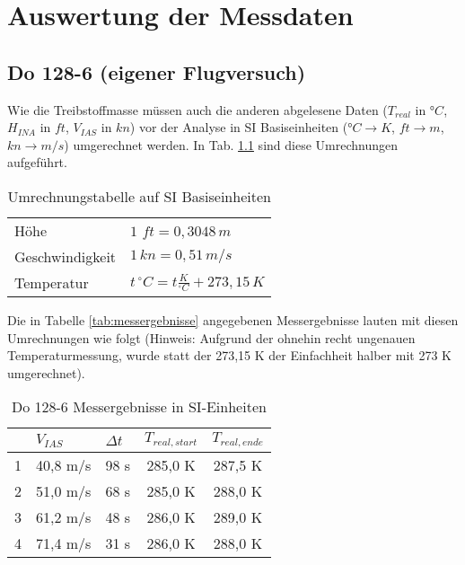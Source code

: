 \chapter{Auswertung der Messdaten}
\label{chapter:auswertung}

\section{Do 128-6 (eigener Flugversuch)}
Wie die Treibstoffmasse müssen auch die anderen abgelesene Daten ($T_{real}$ in °$C$, $H_{INA}$ in $ft$, $V_{IAS}$ in $kn$) vor der Analyse in SI Basiseinheiten (°$C  \rightarrow K$, $ft \rightarrow m$, $kn \rightarrow m/s$) umgerechnet werden. In Tab. \ref{tab:umrechnung_einheiten} sind diese Umrechnungen aufgeführt.\\

\begin{table}[h]
	\centering
	\begin{tabular}{l l}
		\hline
		Höhe 			& $1$ $ft = 0,3048\,m$ 								\\
		Geschwindigkeit	&   $1\,kn = 0,51\,m/s$								\\
		Temperatur 		&  $t\,^\circ C = t\frac{K}{^\circ C}+273,15\,K$	\\
		\hline		
	\end{tabular}
	\caption{Umrechnungstabelle auf SI Basiseinheiten} \label{tab:umrechnung_einheiten}
\end{table}

\noindent Die in Tabelle \ref{tab:messergebnisse} angegebenen Messergebnisse lauten mit diesen Umrechnungen wie folgt (Hinweis: Aufgrund der ohnehin recht ungenauen Temperaturmessung, wurde statt der 273,15 K der Einfachheit halber mit 273 K umgerechnet).

\begin{table}[h]
	\centering
	\begin{tabular}{|c|c|c|c|c|}
		\hline
		& \multicolumn{1}{l|}{\textbf{$V_{IAS}$}} & \multicolumn{1}{l|}{\textbf{$\Delta t$}} & \multicolumn{1}{l|}{\textbf{$T_{real,start}$}} & \multicolumn{1}{l|}{\textbf{$T_{real,ende}$}} \\ \hline
		1 & 40,8 m/s         & 98 s         & 285,0 K         & 287,5 K    \\ \hline
		2 & 51,0 m/s         & 68 s         & 285,0 K         & 288,0 K    \\ \hline
		3 & 61,2 m/s         & 48 s         & 286,0 K         & 289,0 K    \\ \hline
		4 & 71,4 m/s         & 31 s         & 286,0 K         & 288,0 K    \\ \hline
	\end{tabular}
	\caption{Do 128-6 Messergebnisse in SI-Einheiten} \label{tab:messergebnisse-si}
\end{table}

